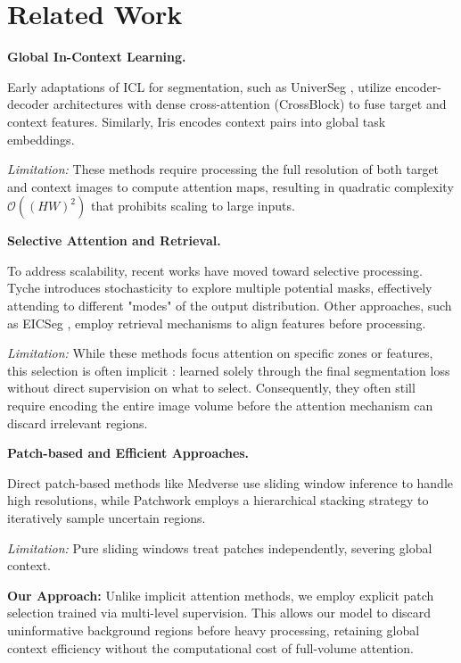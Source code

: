 \documentclass[runningheads]{llncs}
\begin{document}
\section{Related Work}

\textbf{Global In-Context Learning.}

Early adaptations of ICL for segmentation, such as UniverSeg \cite{butoiUniverSegUniversalMedical2023}, utilize encoder-decoder architectures with dense cross-attention (CrossBlock) to fuse target and context features. Similarly, Iris \cite{gaoShowSegmentUniversal2025} encodes context pairs into global task embeddings.

\textit{Limitation:} These methods require processing the full resolution of both target and context images to compute attention maps, resulting in quadratic complexity $\mathcal{O}((HW)^2)$ that prohibits scaling to large inputs.

\textbf{Selective Attention and Retrieval.}

To address scalability, recent works have moved toward selective processing. Tyche \cite{rakicTycheStochasticInContext2025} introduces stochasticity to explore multiple potential masks, effectively attending to different "modes" of the output distribution. Other approaches, such as EICSeg \cite{xieEICSegUniversalMedical2026}, employ retrieval mechanisms to align features before processing.

\textit{Limitation:} While these methods focus attention on specific zones or features, this selection is often implicit : learned solely through the final segmentation loss without direct supervision on what to select. Consequently, they often still require encoding the entire image volume before the attention mechanism can discard irrelevant regions.

\textbf{Patch-based and Efficient Approaches.}

Direct patch-based methods like Medverse \cite{huMedverseUniversalModel2025a} use sliding window inference to handle high resolutions, while Patchwork \cite{reisertDeepNeuralPatchworks2022a} employs a hierarchical stacking strategy to iteratively sample uncertain regions.

\textit{Limitation:} Pure sliding windows treat patches independently, severing global context.


\textbf{Our Approach:} Unlike implicit attention methods, we employ explicit patch selection trained via multi-level supervision. This allows our model to discard uninformative background regions before heavy processing, retaining global context efficiency without the computational cost of full-volume attention.
\end{document}
